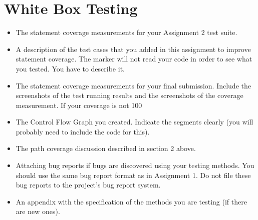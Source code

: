 \documentclass[fontsize=12pt,paper=letter,twoside]{scrartcl}
\begin{document}
\newpage
\section{White Box Testing}

\begin{itemize}
\item The statement coverage measurements for your Assignment 2 test suite.
\item A description of the test cases that you added in this assignment to improve statement
coverage. The marker will not read your code in order to see what you tested. You have to
describe it.
\item The statement coverage measurements for your final submission. Include the screenshots of
the test running results and the screenshots of the coverage measurement. If your coverage is
not 100%
\item The Control Flow Graph you created. Indicate the segments clearly (you will probably need
to include the code for this).
\item The path coverage discussion described in section 2 above.
\item Attaching bug reports if bugs are discovered using your testing methods. You should use the
same bug report format as in Assignment 1. Do not file these bug reports to the project’s bug
report system.
\item An appendix with the specification of the methods you are testing (if there are new ones). 
\end{itemize}
\end{document}
